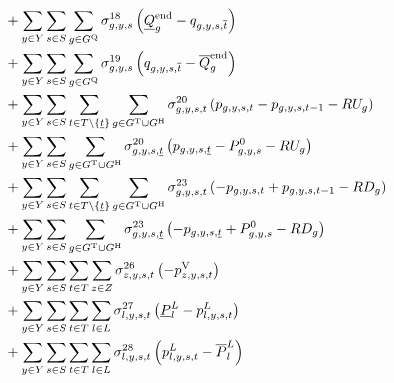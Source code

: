 \documentclass{article}
\begin{document}
\begin{align}
		& + \sum\limits_{\iYear \in \sYears}\sum\limits_{\iScenario \in \sScenarios} \sum\limits_{\iGenerator \in \sStorage} \dMinStorageEnergyIntervalEnd \left(\cStorageUnitEnergyIntervalEndMin - \vStorageUnitEnergy[\iGenerator,\iYear,\iScenario,\iIntervalTerminal]\right)\\
		& + \sum\limits_{\iYear \in \sYears}\sum\limits_{\iScenario \in \sScenarios} \sum\limits_{\iGenerator \in \sStorage} \dMaxStorageEnergyIntervalEnd \left(\vStorageUnitEnergy[\iGenerator,\iYear,\iScenario,\iIntervalTerminal] - \cStorageUnitEnergyIntervalEndMax\right)\\
		& + \sum\limits_{\iYear \in \sYears}\sum\limits_{\iScenario \in \sScenarios}\sum\limits_{\iInterval \in \sIntervals \setminus \{\iIntervalStart\}} \sum\limits_{\iGenerator \in \sGeneratorsThermal \cup \sGeneratorsHydro} \dRampRateUp \left(\vPower - \vPower[\iGenerator,\iYear,\iScenario,\iInterval-1] - \cRampRateUp\right)\\
		& + \sum\limits_{\iYear \in \sYears}\sum\limits_{\iScenario \in \sScenarios} \sum\limits_{\iGenerator \in \sGeneratorsThermal \cup \sGeneratorsHydro} \dRampRateUp[\iGenerator,\iYear,\iScenario,\iIntervalStart] \left(\vPower[\iGenerator,\iYear,\iScenario,\iIntervalStart] - \cPowerInitial - \cRampRateUp\right)\\
		& + \sum\limits_{\iYear \in \sYears}\sum\limits_{\iScenario \in \sScenarios}\sum\limits_{\iInterval \in \sIntervals \setminus \{\iIntervalStart\}} \sum\limits_{\iGenerator \in \sGeneratorsThermal \cup \sGeneratorsHydro} \dRampRateDown \left(- \vPower + \vPower[\iGenerator,\iYear,\iScenario,\iInterval-1] - \cRampRateDown\right)\\
		& + \sum\limits_{\iYear \in \sYears}\sum\limits_{\iScenario \in \sScenarios} \sum\limits_{\iGenerator \in \sGeneratorsThermal \cup \sGeneratorsHydro} \dRampRateDown[\iGenerator,\iYear,\iScenario,\iIntervalStart] \left(- \vPower[\iGenerator,\iYear,\iScenario,\iIntervalStart] + \cPowerInitial - \cRampRateDown\right)\\
		& + \sum\limits_{\iYear \in \sYears}\sum\limits_{\iScenario \in \sScenarios}\sum\limits_{\iInterval \in \sIntervals} \sum\limits_{\iZone \in \sZones} \dNonNegativeLostLoad \left(- \vLostLoadPower\right)\\
		& + \sum\limits_{\iYear \in \sYears}\sum\limits_{\iScenario \in \sScenarios}\sum\limits_{\iInterval \in \sIntervals} \sum\limits_{\iLink \in \sLinks} \dMinPowerFlow \left(\cPowerFlowMin - \vPowerFlow\right)\\
		& + \sum\limits_{\iYear \in \sYears}\sum\limits_{\iScenario \in \sScenarios}\sum\limits_{\iInterval \in \sIntervals} \sum\limits_{\iLink \in \sLinks} \dMaxPowerFlow \left(\vPowerFlow - \cPowerFlowMax\right)\\\nonumber
\end{align}
\end{document}

